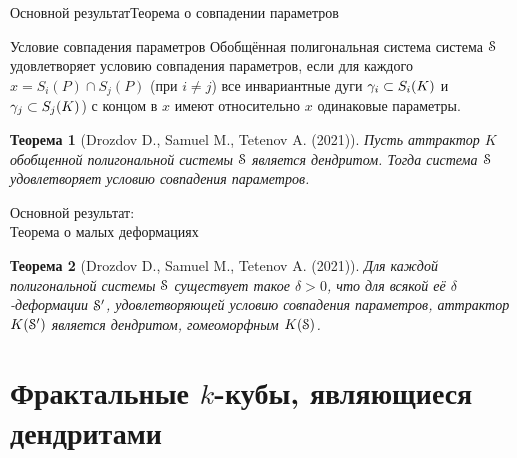 \documentclass[aspectratio=1610, 10pt, notheorems]{beamer}
\newtheorem{theorem}     {Теорема}
\begin{document}


\begin{frame}{Основной результат}{Теорема о совпадении параметров}
\begin{block}{Условие совпадения параметров}
Обобщённая полигональная система система ${\EuScript S}$ удовлетворяет условию совпадения параметров, если для каждого $x=S_i(P)\cap S_j(P)$ (при $i\neq j$) все инвариантные дуги $\gamma_i\subset S_i(K)$ и $\gamma_j\subset S_j(K)$) с концом в $x$ имеют относительно $x$ одинаковые параметры.
\end{block}
\begin{theorem}[Drozdov D., Samuel M., Tetenov A. (2021)]
Пусть аттрактор $K$ обобщенной полигональной системы ${\EuScript S}$ является дендритом. 
Тогда система ${\EuScript S}$ удовлетворяет условию совпадения параметров.
\end{theorem}
\end{frame}


\begin{frame}{Основной результат:\\Теорема о малых деформациях}
\begin{theorem}[Drozdov D., Samuel M., Tetenov A. (2021)]
Для каждой полигональной системы ${\EuScript S}$ существует такое $\delta > 0$, что для всякой её $\delta$-деформации ${\EuScript S}'$, удовлетворяющей условию совпадения параметров, аттрактор $K({\EuScript S}')$ является дендритом, гомеоморфным $K({\EuScript S})$.
\end{theorem}
\end{frame}



\section{Фрактальные $k$-кубы, являющиеся дендритами}
\end{document}
